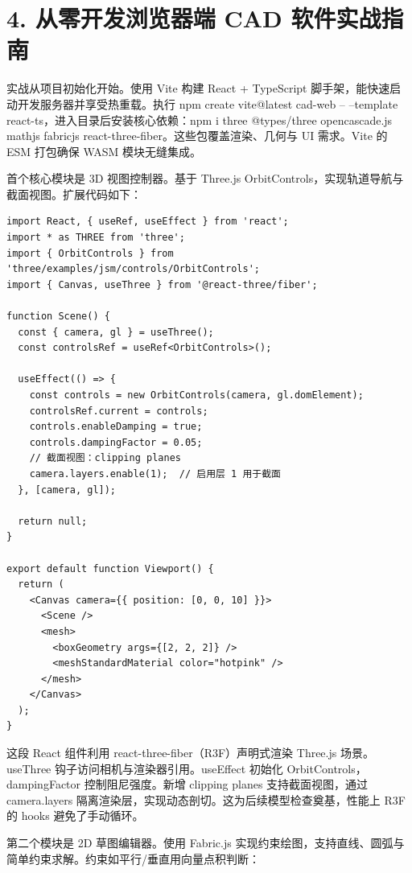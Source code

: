 \chapter{4. 从零开发浏览器端 CAD 软件实战指南}
实战从项目初始化开始。使用 Vite 构建 React + TypeScript 脚手架，能快速启动开发服务器并享受热重载。执行 npm create vite@latest cad-web -- --template react-ts，进入目录后安装核心依赖：npm i three @types/three opencascade.js mathjs fabricjs react-three-fiber。这些包覆盖渲染、几何与 UI 需求。Vite 的 ESM 打包确保 WASM 模块无缝集成。\par
首个核心模块是 3D 视图控制器。基于 Three.js OrbitControls，实现轨道导航与截面视图。扩展代码如下：\par
\begin{lstlisting}[language=tsx]
import React, { useRef, useEffect } from 'react';
import * as THREE from 'three';
import { OrbitControls } from 'three/examples/jsm/controls/OrbitControls';
import { Canvas, useThree } from '@react-three/fiber';

function Scene() {
  const { camera, gl } = useThree();
  const controlsRef = useRef<OrbitControls>();

  useEffect(() => {
    const controls = new OrbitControls(camera, gl.domElement);
    controlsRef.current = controls;
    controls.enableDamping = true;
    controls.dampingFactor = 0.05;
    // 截面视图：clipping planes
    camera.layers.enable(1);  // 启用层 1 用于截面
  }, [camera, gl]);

  return null;
}

export default function Viewport() {
  return (
    <Canvas camera={{ position: [0, 0, 10] }}>
      <Scene />
      <mesh>
        <boxGeometry args={[2, 2, 2]} />
        <meshStandardMaterial color="hotpink" />
      </mesh>
    </Canvas>
  );
}
\end{lstlisting}
这段 React 组件利用 react-three-fiber（R3F）声明式渲染 Three.js 场景。useThree 钩子访问相机与渲染器引用。useEffect 初始化 OrbitControls，dampingFactor 控制阻尼强度。新增 clipping planes 支持截面视图，通过 camera.layers 隔离渲染层，实现动态剖切。这为后续模型检查奠基，性能上 R3F 的 hooks 避免了手动循环。\par
第二个模块是 2D 草图编辑器。使用 Fabric.js 实现约束绘图，支持直线、圆弧与简单约束求解。约束如平行/垂直用向量点积判断：\par
